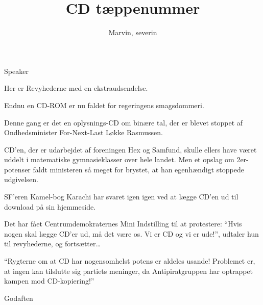 \documentclass[a4paper,11pt]{article}
\title{CD tæppenummer}
\author{Marvin, severin}
\begin{document}
\maketitle

\begin{roles}
 Speaker
\end{roles}

\begin{props}
\end{props}

  
\begin{sketch}


 Her er Revyhederne med en ekstraudsendelse.

Endnu en CD-ROM er nu faldet for regeringens smagsdommeri.

Denne gang er det en oplysnings-CD om binære tal, der er blevet stoppet 
af Ondhedsminister For-Next-Last Løkke Rasmussen.

CD'en, der er udarbejdet af foreningen Hex og Samfund, skulle ellers 
have været uddelt i matematiske gymnasieklasser over hele landet. Men et 
opslag om 2er-potenser faldt ministeren så meget for brystet, at han 
egenhændigt stoppede udgivelsen.

SF'eren Kamel-bog Karachi har svaret igen igen ved at lægge CD'en ud til 
download på sin hjemmeside.

Det har fået Centrumdemokraternes Mini Indstilling til at protestere: 
``Hvis nogen skal lægge CD'er ud, må det være os. Vi er CD og vi er 
ude!'', udtaler hun til revyhederne, og fortsætter\ldots

``Rygterne om at CD har nogensomhelst potens er aldeles usande! Problemet er, at
ingen kan tilslutte sig partiets meninger, da Antipiratgruppen har optrappet
kampen mod CD-kopiering!''

Godaften

\end{sketch}
\end{document}

